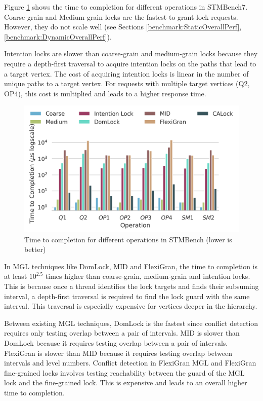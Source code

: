 Figure \ref{ttc} shows the time to completion for different operations in STMBench7. 
Coarse-grain and Medium-grain locks are the fastest to grant lock requests. However, they do not scale well (see Sections \ref{benchmark:StaticOverallPerf}, \ref{benchmark:DynamicOverallPerf}). 

Intention locks are slower than coarse-grain and medium-grain locks because they require a depth-first traversal to acquire intention locks on the paths that lead to a target vertex. The cost of acquiring intention locks is linear in the number of unique paths to a target vertex. For requests with multiple target vertices (Q2, OP4), this cost is multiplied and leads to a higher response time. 

\begin{figure}[h]
	\captionsetup{justification=centering}
	\centering
	\includegraphics[width=.8\columnwidth]{figures/PerformanceCharts/TTC}
	\caption{Time to completion for different operations in STMBench (lower is better)}
	\label{ttc}
\end{figure}

In MGL techniques like DomLock, MID and FlexiGran, the time to completion is at least $10^{2.5}$ times higher than coarse-grain, medium-grain and intention locks. This is because once a thread identifies the lock targets and finds their subsuming interval, a depth-first traversal is required to find the lock guard with the same interval. This traversal is especially expensive for vertices deeper in the hierarchy.


Between existing MGL techniques, DomLock is the fastest since conflict detection requires only testing overlap between a pair of intervals. MID is slower than DomLock because it requires testing overlap between a pair of intervals. FlexiGran is slower than MID because it requires testing overlap between intervals and level numbers. Conflict detection in FlexiGran MGL and FlexiGran fine-grained locks involves testing reachability between the guard of the MGL lock and the fine-grained lock. This is expensive and leads to an overall higher time to completion.

